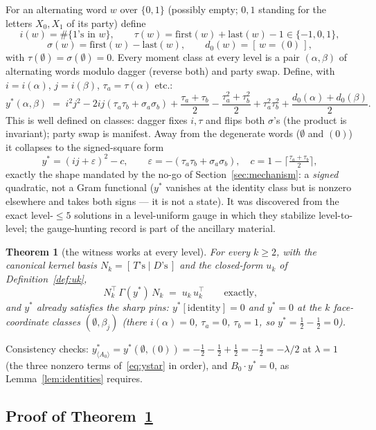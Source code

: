 \documentclass[11pt]{article}
\newtheorem{theorem}{Theorem}[section]
\newcommand{\la}{\langle}
\newcommand{\ra}{\rangle}
\newcommand{\eps}{\varepsilon}
\newcommand{\lam}{\lambda}
\begin{document}
For an alternating word $w$ over $\{0,1\}$ (possibly empty; $0,1$ standing
for the letters $X_0,X_1$ of its party) define
\[
i(w)=\#\{1\text{'s in }w\},\qquad
\tau(w)=\mathrm{first}(w)+\mathrm{last}(w)-1\in\{-1,0,1\},
\]
\[
\sigma(w)=\mathrm{first}(w)-\mathrm{last}(w),\qquad
d_0(w)=[\,w=(0)\,],
\]
with $\tau(\emptyset)=\sigma(\emptyset)=0$. Every moment class at every
level is a pair $(\alpha,\beta)$ of alternating words modulo dagger
(reverse both) and party swap. Define, with $i=i(\alpha)$, $j=i(\beta)$,
$\tau_a=\tau(\alpha)$ etc.:
\begin{equation}\label{eq:ystar}
y^\ast(\alpha,\beta)\;=\;i^2j^2-2ij(\tau_a\tau_b+\sigma_a\sigma_b)
+\frac{\tau_a+\tau_b}2-\frac{\tau_a^2+\tau_b^2}2
+\tau_a^2\tau_b^2+\frac{d_0(\alpha)+d_0(\beta)}2 .
\end{equation}
This is well defined on classes: dagger fixes $i,\tau$ and flips both
$\sigma$'s (the product is invariant); party swap is manifest. Away from
the degenerate words ($\emptyset$ and $(0)$) it collapses to the
signed-square form
\[
y^\ast=(ij+\eps)^2-c,\qquad
\eps=-(\tau_a\tau_b+\sigma_a\sigma_b),\quad
c=1-\big\lceil\tfrac{\tau_a+\tau_b}2\big\rceil,
\]
exactly the shape mandated by the no-go of
Section~\ref{sec:mechanism}: a \emph{signed} quadratic, not a Gram
functional ($y^\ast$ vanishes at the identity class but is nonzero
elsewhere and takes both signs --- it is not a state). It was discovered
from the exact level-$\le5$ solutions in a level-uniform gauge in which
they stabilize level-to-level; the gauge-hunting record is part of the
ancillary material.

\begin{theorem}[the witness works at every level]\label{thm:witness}
For every $k\ge2$, with the canonical kernel basis
$N_k=[\,T\text{'s}\mid D\text{'s}\,]$ and the closed-form $u_k$ of
Definition~\ref{def:uk},
\[
N_k^\top\,\Gamma(y^\ast)\,N_k\;=\;u_k\,u_k^\top\qquad\text{exactly,}
\]
and $y^\ast$ already satisfies the sharp pins: $y^\ast[\mathrm{identity}]=0$
and $y^\ast=0$ at the $k$ face-coordinate classes
$(\emptyset,\beta_j)$ (there $i(\alpha)=0$, $\tau_a=0$, $\tau_b=1$, so
$y^\ast=\tfrac12-\tfrac12=0$).
\end{theorem}

Consistency checks:
$y^\ast_{\la A_0\ra}=y^\ast(\emptyset,(0))=-\tfrac12-\tfrac12+\tfrac12
=-\tfrac12=-\lam/2$ at $\lam=1$ (the three nonzero terms
of~\eqref{eq:ystar} in order), and $B_0\cdot y^\ast=0$, as
Lemma~\ref{lem:identities} requires.

\subsection{Proof of Theorem~\ref{thm:witness}}
\end{document}
